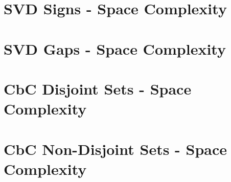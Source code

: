 \documentclass[ClusteringConnectionsMAIN.tex]{subfiles}
\begin{document}
%
%
\chapter{SVD Signs - Space Complexity}



%
%
\chapter{SVD Gaps - Space Complexity}



%
%
\chapter{CbC Disjoint Sets - Space Complexity}



%
%
\chapter{CbC Non-Disjoint Sets - Space Complexity}

\end{document}
